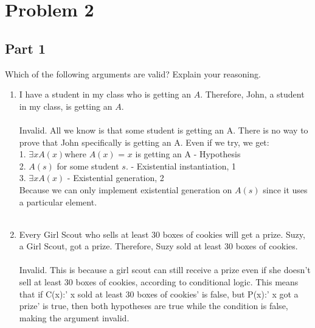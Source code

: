 \documentclass{amsart}
\theoremstyle{definition}
\theoremstyle{Exercise}
\theoremstyle{remark}
\theoremstyle{rule}
\numberwithin{equation}{section}
\begin{document}
\section*{Problem 2}
\subsection*{Part 1}

 Which of the following arguments are valid? Explain your reasoning.\\
 \begin{enumerate}[label=(\alph*)]
\item I have a student in my class who is getting an $A$. Therefore, John, a student in my class, is getting an $A$. \\\\
Invalid. All we know is that some student is getting an A. There is no way to prove that John specifically is getting an A. Even if we try, we get:\\
1. $\exists x A(x) $where $A(x)$ = $x$ is getting an A  - Hypothesis\\
2. $A(s)$ for some student $s$.   - Existential instantiation, 1\\
3. $\exists x A(x)$ - Existential generation, 2\\
Because we can only implement existential generation on $A(s)$ since it uses a particular element.
\\\\
\item Every Girl Scout who sells at least 30 boxes of cookies will get a prize. Suzy, a Girl Scout, got a prize. Therefore, Suzy sold at least 30 boxes of cookies.\\\\
Invalid. This is because a girl scout can still receive a prize even if she doesn't sell at least 30 boxes of cookies, according to conditional logic. This means that if C(x):' x sold at least 30 boxes of cookies' is false, but P(x):' x got a prize' is true, then both hypotheses are true while the condition is false, making the argument invalid.
\\\\
 \end{enumerate}
\end{document}
